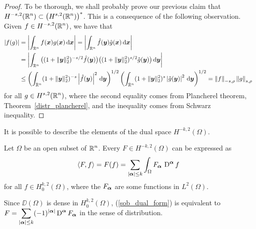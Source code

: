 \begin{proof}
To be thorough, we shall probably prove our previous claim that
$\displaystyle H^{-s,2}(\mathbb{R}^n) \subset \big(H^{s,2}(\mathbb{R}^n)\big)^\ast$.
This is a consequence of the following observation.
Given $\displaystyle f \in H^{-s,2}(\mathbb{R}^n)$, we have that
\begin{align*}
|f(g)| &= \left| \int_{\mathbb{R}^n} f({\bm{x}}) g({\bm{x}}) \,\mathrm{d}{{\bm{x}}} \right|
= \left| \int_{\mathbb{R}^n} \hat{f}({\bm{y}}) \hat{g}({\bm{x}}) \,\mathrm{d}{{\bm{x}}} \right| \\
&= \left| \int_{\mathbb{R}^n} \big( (1+\|{\bm{y}}\|_2^2)^{-s/2}\hat{f}({\bm{y}})\big)
\big( (1+\|{\bm{y}}\|_2^2)^{s/2} \hat{g}({\bm{y}}) \big) \,\mathrm{d}{{\bm{y}}} \right| \\
&\leq \left( \int_{\mathbb{R}^n} (1+\|{\bm{y}}\|_2^2)^{-s}
\left|\hat{f}({\bm{y}})\right|^2 \,\mathrm{d}{{\bm{y}}} \right)^{1/2}
\left( \int_{\mathbb{R}^n} (1+\|{\bm{y}}\|_2^2)^s\left|\hat{g}({\bm{y}})\right|^2
\,\mathrm{d}{{\bm{y}}} \right)^{1/2}
= \left\| f\right\|_{-s,\rho} \left\| g \right\|_{s,\rho} 
\end{align*}
for all $\displaystyle g \in H^{s,2}(\mathbb{R}^n)$, where the second
equality comes from Plancherel theorem,
Theorem~\ref{distr_plancherel}, and the inequality comes from Schwarz
inequality.
\end{proof}

It is possible to describe the elements of the dual space
$\displaystyle H^{-k,2}(\Omega)$.

\begin{theorem}
Let $\Omega$ be an open subset of $\displaystyle \mathbb{R}^n$.  Every
$\displaystyle F\in H^{-k,2}(\Omega)$ can be expressed as
\begin{equation} \label{sob_dual_form}
\left\langle{F} , {f}\right\rangle = F(f) = \sum_{|{\bm{\alpha}}|\leq k} \int_\Omega
F_{{\bm{\alpha}}}\,\operatorname{D}^{{\bm{\alpha}}} f
\end{equation}
for all $\displaystyle f \in H^{k,2}_0(\Omega)$, where the $F_{{\bm{\alpha}}}$
are some functions in $\displaystyle L^2(\Omega)$.
\end{theorem}

\begin{rmk}
Since $\DD(\Omega)$ is dense in $\displaystyle H^{k,2}_0(\Omega)$,
(\ref{sob_dual_form}) is equivalent to
$\displaystyle F = \sum_{|{\bm{\alpha}}|\leq k} (-1)^{|{\bm{\alpha}}|}
\operatorname{D}^{{\bm{\alpha}}} F_{{\bm{\alpha}}}$ in the sense of distribution.
\end{rmk}

